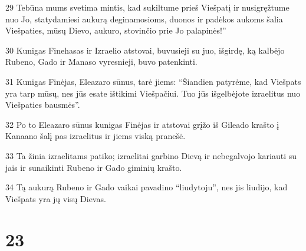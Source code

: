\par 29 Tebūna mums svetima mintis, kad sukiltume prieš Viešpatį ir nusigręžtume nuo Jo, statydamiesi aukurą deginamosioms, duonos ir padėkos aukoms šalia Viešpaties, mūsų Dievo, aukuro, stovinčio prie Jo palapinės!” 
\par 30 Kunigas Finehasas ir Izraelio atstovai, buvusieji su juo, išgirdę, ką kalbėjo Rubeno, Gado ir Manaso vyresnieji, buvo patenkinti. 
\par 31 Kunigas Finėjas, Eleazaro sūnus, tarė jiems: “Šiandien patyrėme, kad Viešpats yra tarp mūsų, nes jūs esate ištikimi Viešpačiui. Tuo jūs išgelbėjote izraelitus nuo Viešpaties bausmės”. 
\par 32 Po to Eleazaro sūnus kunigas Finėjas ir atstovai grįžo iš Gileado krašto į Kanaano šalį pas izraelitus ir jiems viską pranešė. 
\par 33 Ta žinia izraelitams patiko; izraelitai garbino Dievą ir nebegalvojo kariauti su jais ir sunaikinti Rubeno ir Gado giminių krašto. 
\par 34 Tą aukurą Rubeno ir Gado vaikai pavadino “liudytoju”, nes jis liudijo, kad Viešpats yra jų visų Dievas.



\chapter{23}

